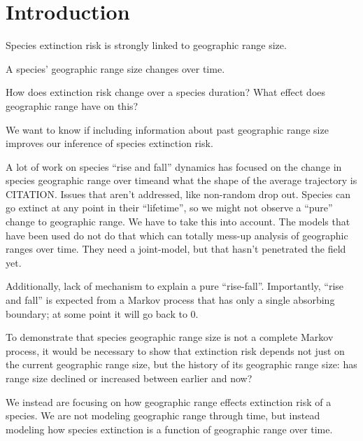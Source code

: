 \documentclass[12pt,letterpaper]{article}
\begin{document}
\section{Introduction}

Species extinction risk is strongly linked to geographic range size.

A species' geographic range size changes over time.

How does extinction risk change over a species duration? What effect does geographic range have on this?

We want to know if including information about past geographic range size improves our inference of species extinction risk.


A lot of work on species ``rise and fall'' dynamics has focused on the change in species geographic range over timeand what the shape of the average trajectory is CITATION. Issues that aren't addressed, like non-random drop out. Species can go extinct at any point in their ``lifetime'', so we might not observe a ``pure'' change to geographic range. We have to take this into account. The models that have been used do not do that which can totally mess-up analysis of geographic ranges over time. They need a joint-model, but that hasn't penetrated the field yet.

Additionally, lack of mechanism to explain a pure ``rise-fall''. Importantly, ``rise and fall'' is expected from a Markov process that has only a single absorbing boundary; at some point it will go back to 0. 

To demonstrate that species geographic range size is not a complete Markov process, it would be necessary to show that extinction risk depends not just on the current geographic range size, but the history of its geographic range size: has range size declined or increased between earlier and now?


We instead are focusing on how geographic range effects extinction risk of a species. We are not modeling geographic range through time, but instead modeling how species extinction is a function of geographic range over time. 
\end{document}
